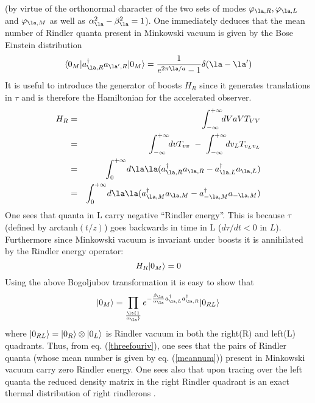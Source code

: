 \documentclass[12pt]{article}
\begin{document}
(by virtue of the orthonormal character of the two sets of modes
$\varphi_{\la,R} ,\varphi_{\la,L}$ and $\varphi_{\la , M}$ as well as
$\alpha_{\la}^2 -\beta_{\la}^2 = 1 $).
One immediately deduces that the mean number of Rindler quanta present in
Minkowski vacuum is given by the Bose Einstein distribution
\begin{equation}
\bra{0_M} a_{\la,R}^{\dagger} a_{\la^{\prime},R} \ket{0_M} = {1 \over
e^{2 \pi \la /a} - 1} \delta (\la - \la^{\prime})
\label{meannum}
\end{equation}
It is useful to introduce the generator of boosts $ H_R $ since
it generates translations in $\tau$ and is therefore the Hamiltonian for
the accelerated observer.
\begin{eqnarray} H_R &=& \int_{-\infty}^{+\infty}\!\! dV
 aV T_{VV} \nonumber\\
&=& \int_{-\infty}^{+\infty}\!\! dv T_{vv} \ -
\   \int_{-\infty}^{+\infty}\!\! dv_L T_{v_Lv_L} \nonumber\\
&=& \int_0^{+\infty}\!
d\la \la (a_{\la,R}^\dagger a_{\la,R} - a_{\la,L}^\dagger a_{\la,L})
\nonumber\\
&=& \int_{0}^{+\infty}\!
d\la \la (a_{\la,M}^\dagger a_{\la,M} - a_{-\la,M}^\dagger a_{-\la,M})
\label{threefouriv} \end{eqnarray}
One sees that quanta in L carry
negative ``Rindler energy''. This is because $\tau$ (defined by arctanh$(t/z)$)
 goes backwards in time in L ($d
\tau / dt <0$ in $L$).
Furthermore since Minkowski vacuum
is invariant under boosts it is annihilated by the Rindler energy operator:
\begin{equation}
H_R\mbox{$ \vert 0_M \rangle $}=0
\label{threefouriv2}
\end{equation}
Using the above Bogoljubov transformation it is easy to show that
\begin{equation} \ket{0_M} = \prod_\la {1 \over \alpha_\la} e^{-{ \beta_\la
\over \alpha_\la} a^\dagger_{\la,L} a^\dagger_{\la,R}} \ket{0_{RL}}
\label{threethreexiii} \end{equation}
where $\mbox{$ \vert 0_{RL} \rangle $}= \mbox{$ \vert 0_{R} \rangle $} \otimes\mbox{$ \vert 0_{L} \rangle $}$ is Rindler vacuum in
both the right(R) and left(L) quadrants.
Thus, from eq. (\ref{threefouriv}), one sees that the
 pairs of Rindler quanta (whose mean number is given by eq. (\ref{meannum}))
present in Minkowski vacuum carry zero Rindler energy.
One sees also that upon tracing over the left quanta the
reduced density matrix in the right Rindler quadrant is an exact thermal
distribution of right rindlerons \cite{birreld}.
\end{document}
